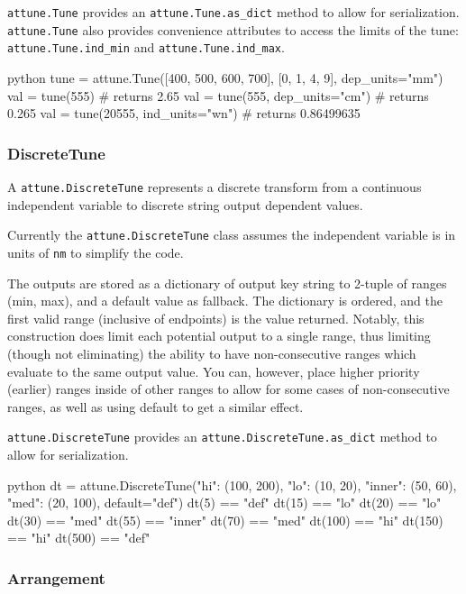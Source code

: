 \texttt{attune.Tune} provides an
\texttt{attune.Tune.as\_dict} method to allow for
serialization. \texttt{attune.Tune} also provides
convenience attributes to access the limits of the tune:
\texttt{attune.Tune.ind\_min} and
\texttt{attune.Tune.ind\_max}.

\begin{codefragment}{python}
tune = attune.Tune([400, 500, 600, 700], [0, 1, 4, 9], dep_units="mm")
val = tune(555) # returns 2.65
val = tune(555, dep_units="cm") # returns 0.265
val = tune(20555, ind_units="wn") # returns 0.86499635
\end{codefragment}

\hypertarget{discretetune}{%
\subsubsection{DiscreteTune}\label{discretetune}}

A \texttt{attune.DiscreteTune} represents a discrete
transform from a continuous independent variable to discrete string
output dependent values.

Currently the \texttt{attune.DiscreteTune} class
assumes the independent variable is in units of \texttt{nm} to simplify
the code.

The outputs are stored as a dictionary of output key string to 2-tuple
of ranges (min, max), and a default value as fallback. The dictionary is
ordered, and the first valid range (inclusive of endpoints) is the value
returned. Notably, this construction does limit each potential output to
a single range, thus limiting (though not eliminating) the ability to
have non-consecutive ranges which evaluate to the same output value. You
can, however, place higher priority (earlier) ranges inside of other
ranges to allow for some cases of non-consecutive ranges, as well as
using default to get a similar effect.

\texttt{attune.DiscreteTune} provides an
\texttt{attune.DiscreteTune.as\_dict} method to allow
for serialization.

\begin{codefragment}{python}
dt = attune.DiscreteTune({"hi": (100, 200), "lo": (10, 20), "inner": (50, 60), "med": (20, 100)}, default="def")
dt(5) == "def"
dt(15) == "lo"
dt(20) == "lo"
dt(30) == "med"
dt(55) == "inner"
dt(70) == "med"
dt(100) == "hi"
dt(150) == "hi"
dt(500) == "def"
\end{codefragment}

\hypertarget{arrangement}{%
\subsubsection{Arrangement}\label{arrangement}}

